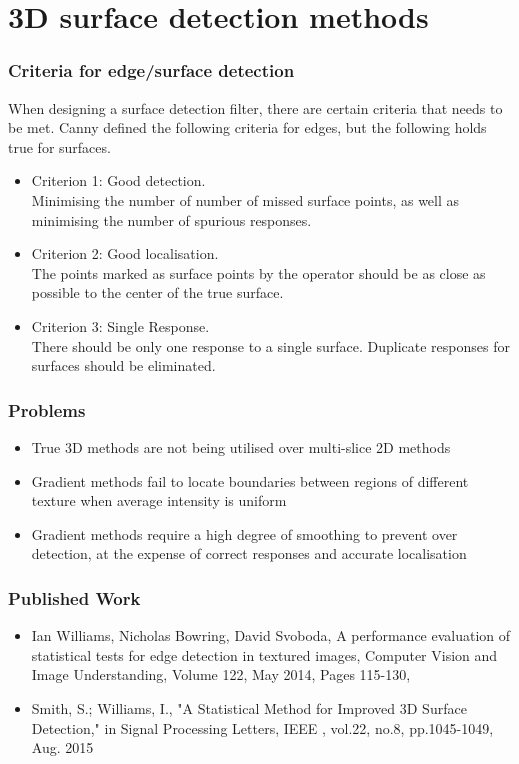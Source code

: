 \documentclass[9pt]{beamer}
\begin{document}
\section{3D surface detection methods}
\begin{frame}
	\frametitle{ Criteria for edge/surface detection }
			When designing a surface detection filter, there are certain criteria that needs to be met. Canny defined the following criteria for edges, but the following holds true for surfaces.
			\begin{itemize}
				\item Criterion 1: Good detection.\\
				Minimising the number of number of missed surface points, as well as minimising the number of spurious responses.
				\item Criterion 2: Good localisation.\\
				The points marked as surface points by the operator should be as close as possible to the center of the true surface.
				\item Criterion 3: Single Response.\\
				There should be only one response to a single surface. Duplicate responses for surfaces should be eliminated.
			\end{itemize}
\end{frame}
\begin{frame}
	\frametitle{Problems}
	\begin{itemize}
	\item True 3D methods are not being utilised over multi-slice 2D methods
	\item Gradient methods fail to locate boundaries between regions of different texture when average intensity is uniform 
	\item Gradient methods require a high degree of smoothing to prevent over detection, at the expense of correct responses and accurate localisation

	\end{itemize}
\end{frame}
\begin{frame}
	\frametitle{Published Work}
	\begin{itemize}
	\item Ian Williams, Nicholas Bowring, David Svoboda, A performance evaluation of statistical tests for edge detection in textured images, Computer Vision and Image Understanding, Volume 122, May 2014, Pages 115-130,
	\item Smith, S.; Williams, I., "A Statistical Method for Improved 3D Surface Detection," in Signal Processing Letters, IEEE , vol.22, no.8, pp.1045-1049, Aug. 2015
	\end{itemize}
\end{frame}
\end{document}
